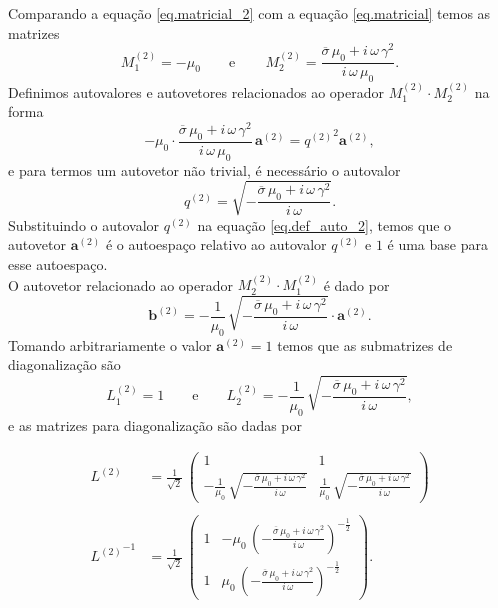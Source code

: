Comparando a equa\c{c}\~ao \ref{eq.matricial_2} com a equa\c{c}\~ao \ref{eq.matricial} temos as matrizes
\begin{equation*}
M^{(2)}_1=-\mu_0\qquad\text{e}\qquad\,M^{(2)}_2=\frac{\overline{\sigma}\,\mu_0+i\,\omega\,\gamma^2}{i\,\omega\,\mu_0}.
\end{equation*}
Definimos autovalores e autovetores relacionados ao operador $M^{(2)}_1\cdot M^{(2)}_2$ na forma
\begin{equation}\label{eq.def_auto_2}
-\mu_0\cdot\frac{\overline{\sigma}\,\mu_0+i\,\omega\,\gamma^2}{i\,\omega\,\mu_0}\,\mathbf{a}^{(2)}={q^{(2)}}^2\mathbf{a}^{(2)},
\end{equation}
e para termos um autovetor n\~ao trivial, \'e necess\'ario o autovalor
\begin{equation*}
q^{(2)}=\sqrt{-\frac{\overline{\sigma}\,\mu_0+i\,\omega\,\gamma^2}{i\,\omega}}.
\end{equation*}
Substituindo o autovalor $q^{(2)}$ na equa\c{c}\~ao \ref{eq.def_auto_2}, temos que o autovetor $\mathbf{a}^{(2)}$ \'e o autoespa\c{c}o relativo ao autovalor $q^{(2)}$ e ${1}$ \'e uma base para esse autoespa\c{c}o.\\
O autovetor relacionado ao operador $M^{(2)}_2\cdot M^{(2)}_1$ \'e dado por
\begin{equation*}
\mathbf{b}^{(2)}=-\frac{1}{\mu_0}\,\sqrt{-\frac{\overline{\sigma}\,\mu_0+i\,\omega\,\gamma^2}{i\,\omega}}\cdot\mathbf{a}^{(2)}.
\end{equation*}
Tomando arbitrariamente o valor $\mathbf{a}^{(2)}=1$ temos que as submatrizes de diagonaliza\c{c}\~ao s\~ao
\begin{equation*}
L^{(2)}_1=1\qquad\text{e}\qquad L^{(2)}_2=-\frac{1}{\mu_0}\,\sqrt{-\frac{\overline{\sigma}\,\mu_0+i\,\omega\,\gamma^2}{i\,\omega}},
\end{equation*}
e as matrizes para diagonaliza\c{c}\~ao s\~ao dadas por
\begin{Large}
\begin{align*}
L^{(2)}&=\frac{1}{\sqrt{2}}\,
\begin{pmatrix}
1&1\\
-\frac{1}{\mu_0}\,\sqrt{-\frac{\overline{\sigma}\,\mu_0+i\,\omega\,\gamma^2}{i\,\omega}}&\frac{1}{\mu_0}\,\sqrt{-\frac{\overline{\sigma}\,\mu_0+i\,\omega\,\gamma^2}{i\,\omega}}
\end{pmatrix}\\\\
{L^{(2)}}^{-1}&=\frac{1}{\sqrt{2}}\,
\begin{pmatrix}
1&-\mu_0\,(-\frac{\overline{\sigma}\,\mu_0+i\,\omega\,\gamma^2}{i\,\omega})^{-\frac{1}{2}}\\
1&\mu_0\,(-\frac{\overline{\sigma}\,\mu_0+i\,\omega\,\gamma^2}{i\,\omega})^{-\frac{1}{2}}
\end{pmatrix}.
\end{align*}
\end{Large}
